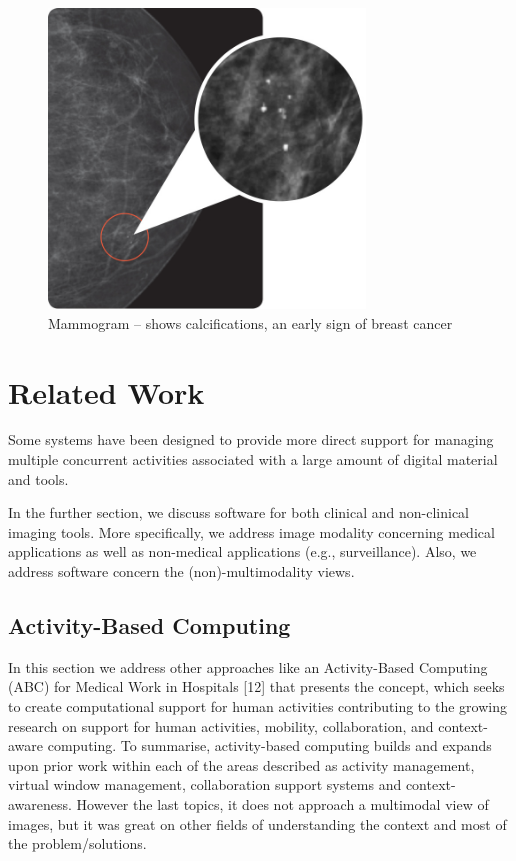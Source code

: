 \begin{figure}[!hbt]
\centering
\includegraphics[width=0.75\textwidth]{calcifications.png}
\caption{\label{fig:frog}Mammogram – shows calcifications, an early sign of breast cancer
}
\end{figure}

\clearpage

\section{Related Work}

Some systems have been designed to provide more direct support for managing multiple concurrent activities associated with a large amount of digital material and tools.

In the further section, we discuss software for both clinical and non-clinical imaging tools. More specifically, we address image modality concerning medical applications as well as non-medical applications (e.g., surveillance). Also, we address software concern the (non)-multimodality views.

\subsection{Activity-Based Computing}

In this section we address other approaches like an Activity-Based Computing (ABC) for Medical Work in Hospitals [12] that presents the concept, which seeks to create computational support for human activities contributing to the growing research on support for human activities, mobility, collaboration, and context-aware computing. To summarise, activity-based computing builds and expands upon prior work within each of the areas described as activity management, virtual window management, collaboration support systems and context-awareness. However the last topics, it does not approach a multimodal view of images, but it was great on other fields of understanding the context and most of the problem/solutions.

